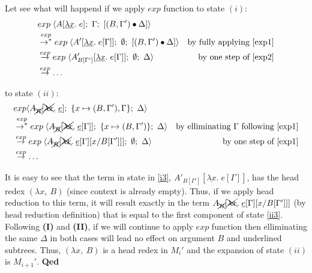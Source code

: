 \documentclass[a4paper, 10pt]{article}
\begin{document}
Let see what will happend if we apply $exp$ function to state $(i)$:
\begin{align}
  &exp\; \langle A[\underline{\lambda x}.\; e];\ \Gamma;\ [(B,\Gamma')\bullet\Delta] \rangle & \\
  &\overset{exp}{\rightarrow^{*}}
  exp\; \langle A'[\underline{\lambda x}.\; e[\Gamma]];\ \emptyset;\ [(B,\Gamma')\bullet\Delta] \rangle
  &\textnormal{by fully applying \eqref{exp1}} \\
  \label{i3} &\overset{exp}{\rightarrow}
  exp\; \langle A'_{B[\Gamma']}[\underline{\lambda x}.\; e[\Gamma]];\ \emptyset;\ \Delta \rangle
  &\textnormal{by one step of \eqref{exp2}} \\
  &\overset{exp}{\rightarrow}
  \dots &
\end{align}

to state $(ii)$:
\begin{align}
  &exp \langle A_{\xcancel{B}}[\xcancel{\lambda x}.\; \underline{e}];\ \{x \mapsto (B,\Gamma'),\Gamma\};\ \Delta \rangle & \\
  &\overset{exp}{\rightarrow^{*}}
  exp\;\langle A_{\xcancel{B}}[\xcancel{\lambda x}.\; \underline{e}[\Gamma]];\ \{x \mapsto (B,\Gamma')\};\
  \Delta \rangle &\textnormal{by elliminating $\Gamma$ following \eqref{exp1}} \\
  \label{ii3} &\overset{exp}{\rightarrow}
  exp\; \langle A_{\xcancel{B}}[\xcancel{\lambda x}.\; \underline{e}[\Gamma][x/B[\Gamma']]];\ \emptyset;\
  \Delta \rangle &\textnormal{by one step of \eqref{exp1}} \\
  &\overset{exp}{\rightarrow}
  \dots &
\end{align}

It is easy to see that the term in state in \eqref{i3}, $A'_{B[\Gamma']}[\underline{\lambda x}.\; e[\Gamma]]$, has the head redex $(\lambda x,\ B)$ (since context is already empty). Thus, if we apply head reduction to this term, it will result exactly in the term $A_{\xcancel{B}}[\xcancel{\lambda x}.\; \underline{e}[\Gamma][x/B[\Gamma']]]$ (by head reduction definition) that is equal to the first component of state \eqref{ii3}. Following \textbf{(I)} and \textbf{(II)}, if we will continue to apply $exp$ function then elliminating the same $\Delta$ in both cases will lead no effect on argument $B$ and underlined subtrees. Thus, $(\lambda x,\ B)$ is a head redex in $M_i'$ and the expansion of state $(ii)$ is $M_{i+1}'$. \hfill{\textbf{Qed}} \\ \\ 
\end{document}
